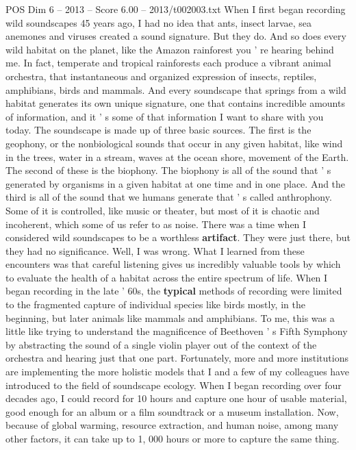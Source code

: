\begin{textsample}{POS Dim 6 – 2013 – Score 6.00 – 2013/t002003.txt}  \label{ex:f6_pos_035}
When I first began recording wild soundscapes 45 years ago, I had no idea that ants, insect larvae, sea anemones and viruses created a sound signature.
But they do.
And so does every wild habitat on the planet, like the Amazon rainforest you ' re hearing behind me.
In fact, temperate and tropical rainforests each produce a vibrant animal orchestra, that instantaneous and organized expression of insects, reptiles, amphibians, birds and mammals.
And every soundscape that springs from a wild habitat generates its own unique signature, one that contains incredible amounts of information, and it ' s some of that information I want to share with you today.
The soundscape is made up of three basic sources.
The first is the geophony, or the nonbiological sounds that occur in any given habitat, like wind in the trees, water in a stream, waves at the ocean shore, movement of the Earth.
The second of these is the biophony.
The biophony is all of the sound that ' s generated by organisms in a given habitat at one time and in one place.
And the third is all of the sound that we humans generate that ' s called anthrophony.
Some of it is controlled, like music or theater, but most of it is chaotic and incoherent, which some of us refer to as noise.
There was a time when I considered wild soundscapes to be a worthless \textbf{artifact}.
They were just there, but they had no significance.
Well, I was wrong.
What I learned from these encounters was that careful listening gives us incredibly valuable tools by which to evaluate the health of a habitat across the entire spectrum of life.
When I began recording in the late ' 60s, the \textbf{typical} methods of recording were limited to the fragmented capture of individual species like birds mostly, in the beginning, but later animals like mammals and amphibians.
To me, this was a little like trying to understand the magnificence of Beethoven ' s Fifth Symphony by abstracting the sound of a single violin player out of the context of the orchestra and hearing just that one part.
Fortunately, more and more institutions are implementing the more holistic models that I and a few of my colleagues have introduced to the field of soundscape ecology.
When I began recording over four decades ago, I could record for 10 hours and capture one hour of usable material, good enough for an album or a film soundtrack or a museum installation.
Now, because of global warming, resource extraction, and human noise, among many other factors, it can take up to 1, 000 hours or more to capture the same thing.

\end{textsample}
